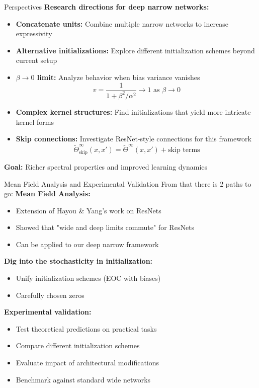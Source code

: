 \documentclass{beamer}
\begin{document}
\begin{frame}{Perspectives}
\textbf{Research directions for deep narrow networks:}
\begin{itemize}
\item \textbf{Concatenate units:} Combine multiple narrow networks to increase expressivity
\item \textbf{Alternative initializations:} Explore different initialization schemes beyond current setup
\item \textbf{$\beta \to 0$ limit:} Analyze behavior when bias variance vanishes
\[ v = \frac{1}{1 + \beta^2/\alpha^2} \to 1 \text{ as } \beta \to 0 \]
\item \textbf{Complex kernel structures:} Find initializations that yield more intricate kernel forms
\item \textbf{Skip connections:} Investigate ResNet-style connections for this framework
\[ \tilde{\Theta}^\infty_{\text{skip}}(x, x') = \tilde{\Theta}^\infty(x, x') + \text{skip terms} \]
\end{itemize}

\textbf{Goal:} Richer spectral properties and improved learning dynamics
\end{frame}

\begin{frame}{Mean Field Analysis and Experimental Validation}
    From that there is 2 paths to go:
\textbf{Mean Field Analysis:}
\begin{itemize}
\item Extension of Hayou \& Yang's work on ResNets
\item Showed that "wide and deep limits commute" for ResNets
\item Can be applied to our deep narrow framework
\end{itemize}


\textbf{Dig into the stochasticity in initialization:}
\begin{itemize}
\item Unify initialization schemes (EOC with biases)
\item Carefully chosen zeros
\end{itemize}

\textbf{Experimental validation:}
\begin{itemize}
\item Test theoretical predictions on practical tasks
\item Compare different initialization schemes
\item Evaluate impact of architectural modifications
\item Benchmark against standard wide networks
\end{itemize}
\end{frame}
\end{document}
